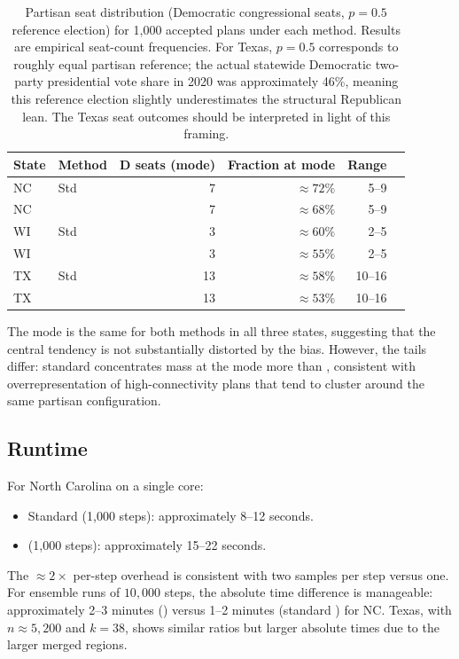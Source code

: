 \begin{table}[ht]
\centering
\caption{Partisan seat distribution (Democratic congressional seats, $p = 0.5$
  reference election) for 1{,}000 accepted plans under each method.
  Results are empirical seat-count frequencies.
  For Texas, $p = 0.5$ corresponds to roughly equal partisan reference; the
  actual statewide Democratic two-party presidential vote share in 2020 was
  approximately 46\%, meaning this reference election slightly underestimates
  the structural Republican lean.
  The Texas seat outcomes should be interpreted in light of this framing.}
\label{tab:partisan}
\renewcommand{\arraystretch}{1.35}
\begin{tabular}{@{}llrrrr@{}}
\toprule
State & Method & D seats (mode) & Fraction at mode & Range \\
\midrule
NC & Std \recom{} & 7 & $\approx\!72\%$ & 5--9 \\
NC & \fr{}        & 7 & $\approx\!68\%$ & 5--9 \\
\midrule
WI & Std \recom{} & 3 & $\approx\!60\%$ & 2--5 \\
WI & \fr{}        & 3 & $\approx\!55\%$ & 2--5 \\
\midrule
TX & Std \recom{} & 13 & $\approx\!58\%$ & 10--16 \\
TX & \fr{}        & 13 & $\approx\!53\%$ & 10--16 \\
\bottomrule
\end{tabular}
\end{table}

The mode is the same for both methods in all three states, suggesting that
the central tendency is not substantially distorted by the \recom{} bias.
However, the tails differ: standard \recom{} concentrates mass at the mode
more than \fr{}, consistent with overrepresentation of high-connectivity
plans that tend to cluster around the same partisan configuration.

\subsection{Runtime}

For North Carolina on a single core:
\begin{itemize}
  \item Standard \recom{} (1{,}000 steps): approximately 8--12 seconds.
  \item \fr{} (1{,}000 steps): approximately 15--22 seconds.
\end{itemize}
The $\approx\!2\times$ per-step overhead is consistent with two \ust{} samples
per step versus one.
For ensemble runs of $10{,}000$ steps, the absolute time difference is
manageable: approximately 2--3 minutes (\fr{}) versus 1--2 minutes (standard
\recom{}) for NC.
Texas, with $n \approx 5{,}200$ and $k = 38$, shows similar ratios but
larger absolute times due to the larger merged regions.
